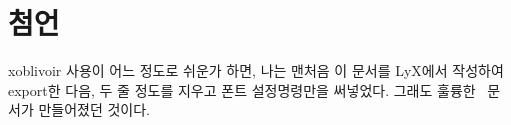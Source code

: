 \documentclass[
	12pt,
	a4paper,
	kosection,
	footnote,
	nobookmarks,
	microtype,
]{oblivoir}
\def\myLabel#1#2{\label{#1}}
\def\myPageREF#1#2{\pageref{#1}}
\def\myLabel#1#2{\label{#2}}
\def\myPageREF#1#2{\pageref{#2}}
\newcommand\xobclass{x\-ob\-liv\-oir\oblivoirallowbreak}
\def\xetexko{\XeTeX-\ko}
\begin{document}
%
%
%
%
%

\section{첨언}
\xobclass{} 사용이 어느 정도로 쉬운가 하면, 나는 맨처음 이 문서를
LyX에서 작성하여 export한 다음, 두 줄 정도를 지우고 폰트
설정명령만을 써넣었다. 그래도 훌륭한 \XeLaTeX\ 문서가 만들어졌던
것이다.
\end{document}
